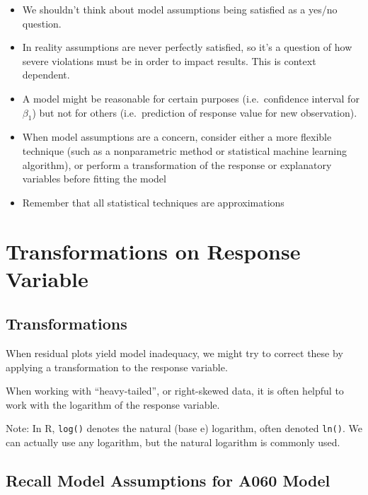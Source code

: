 \documentclass[]{book}
\providecommand{\tightlist}{%
  \setlength{\itemsep}{0pt}\setlength{\parskip}{0pt}}
\begin{document}
\begin{itemize}
\tightlist
\item
  We shouldn't think about model assumptions being satisfied as a yes/no
  question.\\
\item
  In reality assumptions are never perfectly satisfied, so it's a
  question of how severe violations must be in order to impact results.
  This is context dependent.\\
\item
  A model might be reasonable for certain purposes (i.e.~confidence
  interval for \(\beta_1\)) but not for others (i.e.~prediction of
  response value for new observation).\\
\item
  When model assumptions are a concern, consider either a more flexible
  technique (such as a nonparametric method or statistical machine
  learning algorithm), or perform a transformation of the response or
  explanatory variables before fitting the model\\
\item
  Remember that all statistical techniques are approximations
\end{itemize}

\section{Transformations on Response
Variable}\label{transformations-on-response-variable}

\subsection{Transformations}\label{transformations}

When residual plots yield model inadequacy, we might try to correct
these by applying a transformation to the response variable.

When working with ``heavy-tailed'', or right-skewed data, it is often
helpful to work with the logarithm of the response variable.

Note: In R, \texttt{log()} denotes the natural (base e) logarithm, often
denoted \texttt{ln()}. We can actually use any logarithm, but the
natural logarithm is commonly used.

\subsection{Recall Model Assumptions for A060
Model}\label{recall-model-assumptions-for-a060-model}
\end{document}
